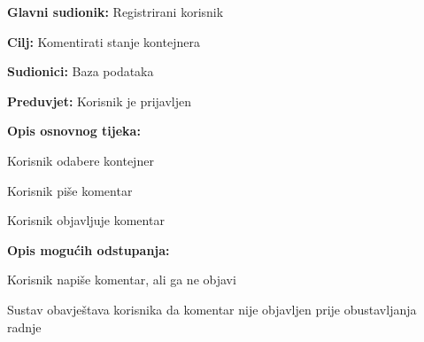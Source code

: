 			\noindent {}
			\begin{packed_item}
				
				\item \textbf{Glavni sudionik:} Registrirani korisnik
				\item  \textbf{Cilj:} Komentirati stanje kontejnera
				\item  \textbf{Sudionici:} Baza podataka
				\item  \textbf{Preduvjet:} Korisnik je prijavljen
				\item  \textbf{Opis osnovnog tijeka:}
				
				\item[] \begin{packed_enum}
					
					\item Korisnik odabere kontejner
					\item Korisnik piše komentar
					\item Korisnik objavljuje komentar
					
				\end{packed_enum}
				
				\item  \textbf{Opis mogućih odstupanja:}
				
				\item[] \begin{packed_item}
					
					\item[2.a] Korisnik napiše komentar, ali ga ne objavi
					\item[] \begin{packed_enum}
						
						\item Sustav obavještava korisnika da komentar nije objavljen prije obustavljanja radnje
						
					\end{packed_enum}
					
				\end{packed_item}
			\end{packed_item}
		
